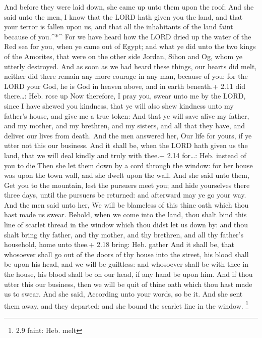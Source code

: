  And before they were laid down, she came up unto them upon
the roof;  And she said unto the men, I know that the LORD
hath given you the land, and that your terror is fallen upon us, and
that all the inhabitants of the land faint because of you.\^{}*\^{}
 For we have heard how the LORD dried up the water of the
Red sea for you, when ye came out of Egypt; and what ye did unto the two
kings of the Amorites, that were on the other side Jordan, Sihon and Og,
whom ye utterly destroyed.  And as soon as we had heard
these things, our hearts did melt, neither did there remain any more
courage in any man, because of you: for the LORD your God, he is God in
heaven above, and in earth beneath.+ 2.11 did there\ldots: Heb. rose up
 Now therefore, I pray you, swear unto me by the LORD,
since I have shewed you kindness, that ye will also shew kindness unto
my father's house, and give me a true token:  And that ye
will save alive my father, and my mother, and my brethren, and my
sisters, and all that they have, and deliver our lives from death.
 And the men answered her, Our life for yours, if ye utter
not this our business. And it shall be, when the LORD hath given us the
land, that we will deal kindly and truly with thee.+ 2.14 for\ldots:
Heb. instead of you to die  Then she let them down by a
cord through the window: for her house was upon the town wall, and she
dwelt upon the wall.  And she said unto them, Get you to
the mountain, lest the pursuers meet you; and hide yourselves there
three days, until the pursuers be returned: and afterward may ye go your
way.  And the men said unto her, We will be blameless of
this thine oath which thou hast made us swear.  Behold,
when we come into the land, thou shalt bind this line of scarlet thread
in the window which thou didst let us down by: and thou shalt bring thy
father, and thy mother, and thy brethren, and all thy father's
household, home unto thee.+ 2.18 bring: Heb. gather  And it
shall be, that whosoever shall go out of the doors of thy house into the
street, his blood shall be upon his head, and we will be guiltless: and
whosoever shall be with thee in the house, his blood shall be on our
head, if any hand be upon him.  And if thou utter this our
business, then we will be quit of thine oath which thou hast made us to
swear.  And she said, According unto your words, so be it.
And she sent them away, and they departed: and she bound the scarlet
line in the window. \footnote{2.9 faint: Heb. melt}

